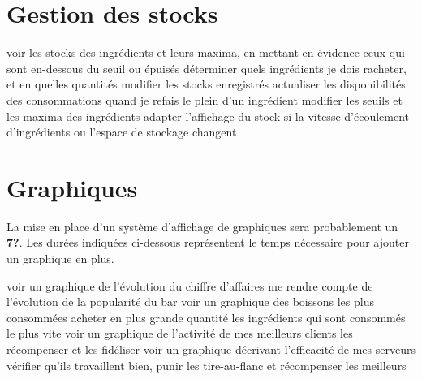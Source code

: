 \documentclass[a4paper,10pt]{article}
\begin{document}
\section{Gestion des stocks}

{voir les stocks des ingrédients et leurs maxima, en mettant en évidence ceux qui sont en-dessous du seuil ou épuisés}
{déterminer quels ingrédients je dois racheter, et en quelles quantités}
{modifier les stocks enregistrés}
{actualiser les disponibilités des consommations quand je refais le plein d'un ingrédient}
{modifier les seuils et les maxima des ingrédients}
{adapter l'affichage du stock si la vitesse d'écoulement d'ingrédients ou l'espace de stockage changent}

\section{Graphiques}

La mise en place d'un système d'affichage de graphiques sera probablement un \textbf{7?}.
Les durées indiquées ci-dessous représentent le temps nécessaire pour ajouter un graphique en plus.

{voir un graphique de l'évolution du chiffre d'affaires}
{me rendre compte de l'évolution de la popularité du bar}
{voir un graphique des boissons les plus consommées}
{acheter en plus grande quantité les ingrédients qui sont consommés le plus vite}
{voir un graphique de l'activité de mes meilleurs clients}
{les récompenser et les fidéliser}
{voir un graphique décrivant l'efficacité de mes serveurs}
{vérifier qu'ils travaillent bien, punir les tire-au-flanc et récompenser les meilleurs}
\end{document}
